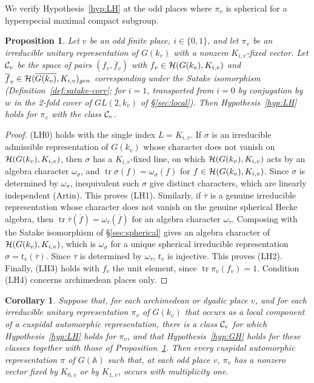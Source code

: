 \documentclass[12pt,letterpaper]{book}
\theoremstyle{plain}
\newtheorem{proposition}[theorem]{Proposition}
\newtheorem{corollary}[theorem]{Corollary}
\theoremstyle{definition}
\theoremstyle{remark}
\theoremstyle{remark}
\newcommand{\tr}{\operatorname{tr}}
\begin{document}
We verify Hypothesis~\ref{hyp:LH} at the odd places where $\pi_v$ is spherical for a hyperspecial maximal compact subgroup.


\begin{proposition}\label{prop:LH-spherical}
Let $v$ be an odd finite place, $i\in\{0,1\}$, and let $\pi_v$ be an
irreducible unitary representation of $G(k_v)$ with a nonzero
$K_{i,v}$-fixed vector. Let ${\cal C}_v$ be the space of pairs
$(f_v,\overline{f}_v)$ with $f_v\in{\cal H}(G(k_v),K_{i,v})$ and
$\overline{f}_v\in{\cal H}(\overline{G(k_v)},K_{i,v})_{gen}$
corresponding under the Satake isomorphism (Definition~\ref{def:satake-corr};
for $i=1$, transported from $i=0$ by conjugation by $w$ in the
2-fold cover of $GL(2,k_v)$ of \S\ref{sec:local}). Then
Hypothesis~\ref{hyp:LH} holds for $\pi_v$ with the class ${\cal C}_v$.
\end{proposition}

\begin{proof} (LH0) holds with the single index $L=K_{i,v}$. If $\sigma$ is an
irreducible admissible representation of $G(k_v)$ whose character does
not vanish on ${\cal H}(G(k_v),K_{i,v})$, then $\sigma$ has a
$K_{i,v}$-fixed line, on which ${\cal H}(G(k_v),K_{i,v})$ acts by an
algebra character $\omega_\sigma$, and $\tr \sigma(f)=\omega_\sigma(f)$
for $f\in{\cal H}(G(k_v),K_{i,v})$. Since $\sigma$ is determined by
$\omega_\sigma$, inequivalent such $\sigma$ give distinct characters,
which are linearly independent (Artin). This proves (LH1). Similarly,
if $\overline{\tau}$ is a genuine irreducible representation whose
character does not vanish on the genuine spherical Hecke algebra, then
$\tr \overline{\tau}(\overline{f})=\omega_{\overline{\tau}}(\overline{f})$
for an algebra character $\omega_{\overline{\tau}}$. Composing with the
Satake isomorphism of \S\ref{sec:spherical} gives an algebra character
of ${\cal H}(G(k_v),K_{i,v})$, which is $\omega_\sigma$ for a unique
spherical irreducible representation $\sigma=t_v(\overline{\tau})$.
Since $\overline{\tau}$ is determined by $\omega_{\overline{\tau}}$,
$t_v$ is injective. This proves (LH2). Finally, (LH3) holds with
$f_v$ the unit element, since $\tr \pi_v(f_v)=1$. Condition (LH4) concerns
archimedean places only.
\end{proof}

\begin{corollary}\label{cor:main}
Suppose that, for each archimedean or dyadic place $v$, and for each
irreducible unitary representation $\pi_v$ of $G(k_v)$ that occurs as a
local component of a cuspidal automorphic representation, there is a
class ${\cal C}_v$ for which Hypothesis~\ref{hyp:LH} holds for $\pi_v$,
and that Hypothesis~\ref{hyp:GH} holds for these classes together with
those of Proposition~\ref{prop:LH-spherical}. Then every cuspidal
automorphic representation $\pi$ of $G({\mathbb{A}})$ such that, at each
odd place $v$, $\pi_v$ has a nonzero vector fixed by $K_{0,v}$ or by
$K_{1,v}$, occurs with multiplicity one.
\end{corollary}
\end{document}
